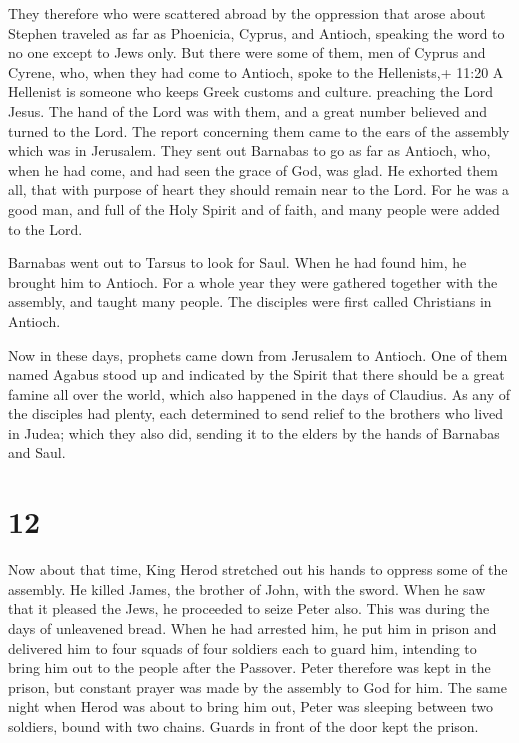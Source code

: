  They therefore who were scattered abroad by the oppression
that arose about Stephen traveled as far as Phoenicia, Cyprus, and
Antioch, speaking the word to no one except to Jews only. 
But there were some of them, men of Cyprus and Cyrene, who, when they
had come to Antioch, spoke to the Hellenists,+ 11:20 A Hellenist is
someone who keeps Greek customs and culture. preaching the Lord Jesus.
 The hand of the Lord was with them, and a great number
believed and turned to the Lord.  The report concerning
them came to the ears of the assembly which was in Jerusalem. They sent
out Barnabas to go as far as Antioch,  who, when he had
come, and had seen the grace of God, was glad. He exhorted them all,
that with purpose of heart they should remain near to the Lord.
 For he was a good man, and full of the Holy Spirit and of
faith, and many people were added to the Lord.

 Barnabas went out to Tarsus to look for Saul.
 When he had found him, he brought him to Antioch. For a
whole year they were gathered together with the assembly, and taught
many people. The disciples were first called Christians in Antioch.

 Now in these days, prophets came down from Jerusalem to
Antioch.  One of them named Agabus stood up and indicated
by the Spirit that there should be a great famine all over the world,
which also happened in the days of Claudius.  As any of the
disciples had plenty, each determined to send relief to the brothers who
lived in Judea;  which they also did, sending it to the
elders by the hands of Barnabas and Saul.

\hypertarget{section-11}{%
\section{12}\label{section-11}}

 Now about that time, King Herod stretched out his hands to
oppress some of the assembly.  He killed James, the brother
of John, with the sword.  When he saw that it pleased the
Jews, he proceeded to seize Peter also. This was during the days of
unleavened bread.  When he had arrested him, he put him in
prison and delivered him to four squads of four soldiers each to guard
him, intending to bring him out to the people after the Passover.
 Peter therefore was kept in the prison, but constant prayer
was made by the assembly to God for him.  The same night
when Herod was about to bring him out, Peter was sleeping between two
soldiers, bound with two chains. Guards in front of the door kept the
prison.

